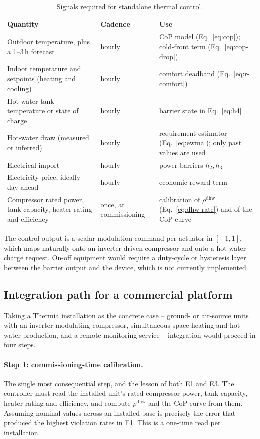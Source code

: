 \documentclass[11pt]{article}
\begin{document}
\begin{table}[h]
\centering
\caption{Signals required for standalone thermal control.}
\label{tab:signals}
\small
\begin{tabular}{p{4.6cm}p{3.0cm}p{6.4cm}}
\toprule
Quantity & Cadence & Use \\
\midrule
Outdoor temperature, plus a 1--3\,h forecast & hourly & CoP model
(Eq.~\ref{eq:cop}); cold-front term (Eq.~\ref{eq:cop-drop}) \\
Indoor temperature and setpoints (heating and cooling) & hourly & comfort
deadband (Eq.~\ref{eq:r-comfort}) \\
Hot-water tank temperature or state of charge & hourly & barrier state in
Eq.~\ref{eq:h4} \\
Hot-water draw (measured or inferred) & hourly & requirement estimator
(Eq.~\ref{eq:ewma}); only past values are used \\
Electrical import & hourly & power barriers $h_2, h_3$ \\
Electricity price, ideally day-ahead & hourly & economic reward term \\
\midrule
Compressor rated power, tank capacity, heater rating and efficiency & once, at
commissioning & calibration of $\rho^{\text{dhw}}$ (Eq.~\ref{eq:dhw-rate}) and of
the CoP curve \\
\bottomrule
\end{tabular}
\end{table}

The control output is a scalar modulation command per actuator in $[-1, 1]$,
which maps naturally onto an inverter-driven compressor and onto a hot-water
charge request. On-off equipment would require a duty-cycle or hysteresis layer
between the barrier output and the device, which is not currently implemented.

\subsection{Integration path for a commercial platform}

Taking a Thermia installation as the concrete case -- ground- or air-source units
with an inverter-modulating compressor, simultaneous space heating and hot-water
production, and a remote monitoring service -- integration would proceed in four
steps.

\paragraph{Step 1: commissioning-time calibration.} The single most consequential
step, and the lesson of both E1 and E3. The controller must read the installed
unit's rated compressor power, tank capacity, heater rating and efficiency, and
compute $\rho^{\text{dhw}}$ and the CoP curve from them. Assuming nominal values
across an installed base is precisely the error that produced the highest
violation rates in E1. This is a one-time read per installation.
\end{document}
